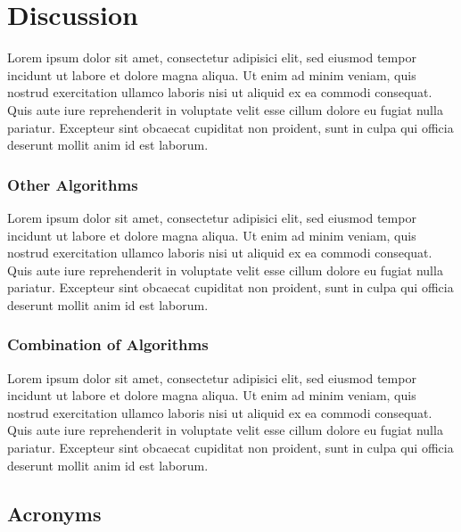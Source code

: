 % 


\section{Discussion}
\label{sec:Discussion}

Lorem ipsum dolor sit amet, consectetur adipisici elit, sed eiusmod tempor incidunt ut labore et dolore magna aliqua. Ut enim ad minim veniam, quis nostrud exercitation ullamco laboris nisi ut aliquid ex ea commodi consequat. Quis aute iure reprehenderit in voluptate velit esse cillum dolore eu fugiat nulla pariatur. Excepteur sint obcaecat cupiditat non proident, sunt in culpa qui officia deserunt mollit anim id est laborum.

\subsubsection{Other Algorithms}
\label{sec:Listings}

Lorem ipsum dolor sit amet, consectetur adipisici elit, sed eiusmod tempor incidunt ut labore et dolore magna aliqua. Ut enim ad minim veniam, quis nostrud exercitation ullamco laboris nisi ut aliquid ex ea commodi consequat. Quis aute iure reprehenderit in voluptate velit esse cillum dolore eu fugiat nulla pariatur. Excepteur sint obcaecat cupiditat non proident, sunt in culpa qui officia deserunt mollit anim id est laborum.


\subsubsection{Combination of Algorithms}
\label{sec:Listings}

Lorem ipsum dolor sit amet, consectetur adipisici elit, sed eiusmod tempor incidunt ut labore et dolore magna aliqua. Ut enim ad minim veniam, quis nostrud exercitation ullamco laboris nisi ut aliquid ex ea commodi consequat. Quis aute iure reprehenderit in voluptate velit esse cillum dolore eu fugiat nulla pariatur. Excepteur sint obcaecat cupiditat non proident, sunt in culpa qui officia deserunt mollit anim id est laborum.


\subsection{Acronyms}
\label{sec:Acronyms}

